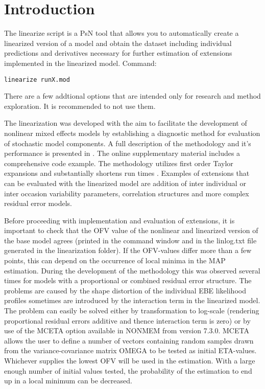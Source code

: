




\maketitle
\newcommand{\guidetoolname}{linearize}


\section{Introduction}
The linearize script is a PsN tool that allows you to automatically create a linearized version of a model and obtain the dataset including
individual predictions and derivatives necessary for further estimation of extensions implemented in the linearized model. Command:
\begin{verbatim}
linearize runX.mod
\end{verbatim}

\noindent There are a few addtional options that are intended only for research and method exploration.
It is recommended to not use them.

The linearization was developed with the aim to facilitate the development of nonlinear mixed effects models by establishing a 
diagnostic method for evaluation of stochastic model components. A full description of the methodology and it's performance is presented in
\cite{Svensson}. The online supplementary 
material includes a comprehensive code example. 
The methodology utilizes first order Taylor expansions and substantially shortens run times \cite{Khandelwal}. 
Examples of extensions  that can be evaluated with the linearized model are addition of inter individual or inter occasion variability parameters, 
correlation structures and more complex residual error models. 

Before proceeding with implementation and evaluation of extensions, it is important to check that the OFV value of the nonlinear and linearized 
version of the base model agrees (printed in the command window and in the linlog.txt file generated in the linearization folder). 
If the OFV-values differ more than a few points, this can depend on the occurrence of local minima in the MAP estimation. During the development of the methodology 
this was observed several times for models with a proportional or combined residual error structure. The problems are caused by the shape distortion
of the individual EBE likelihood profiles sometimes are introduced by the interaction term in the linearized model. The problem can easily be solved either by
transformation to log-scale (rendering proportional residual errors additive and thence interaction term is zero) or by use of the MCETA option 
available in NONMEM  from version 7.3.0. MCETA allows the user to define a number of vectors containing random samples drawn from the 
variance-covariance matrix OMEGA to be tested as initial ETA-values. Whichever supplies the lowest OFV will be used in the estimation. With a large 
enough number of initial values tested, the probability of the estimation to end up in a local minimum can be decreased.

